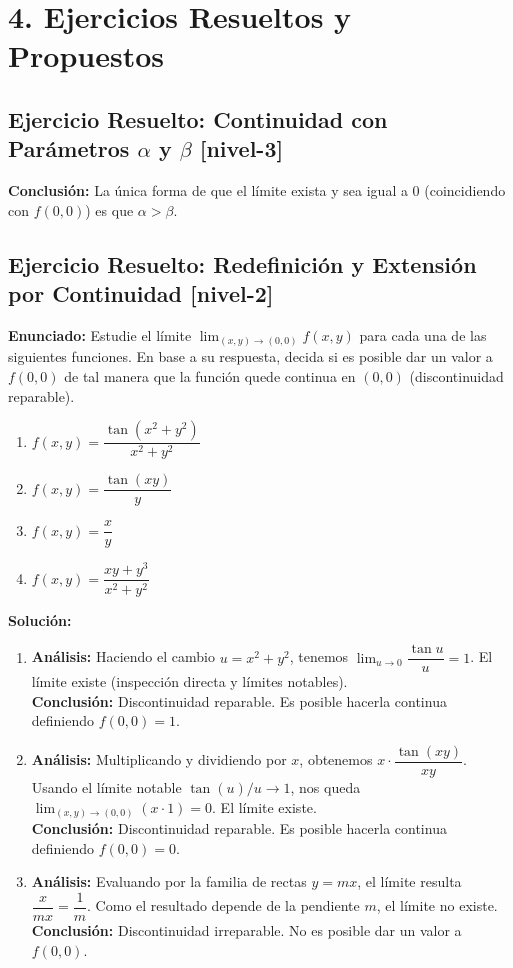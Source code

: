 \documentclass[11pt]{article}
\newenvironment{ejercicios}{%
  \section*{4. Ejercicios Resueltos y Propuestos}%
}{}
\newenvironment{ejercicioresuelto}[2]{\subsection*{Ejercicio Resuelto: #1 \small{[#2]}}}{}
\newcommand{\enunciado}[1]{\textbf{Enunciado:} #1\par\vspace{0.2cm}}
\newcommand{\solucion}[1]{\textbf{Solución:} #1\par\vspace{0.4cm}}
\begin{document}
\begin{ejercicios}
\begin{ejercicioresuelto}{Continuidad con Parámetros $\alpha$ y $\beta$}{nivel-3}
{      \textbf{Conclusión:} La única forma de que el límite exista y sea igual a $0$ (coincidiendo con $f(0,0)$) es que $\alpha > \beta$.
    }
  \end{ejercicioresuelto}

  \begin{ejercicioresuelto}{Redefinición y Extensión por Continuidad}{nivel-2}
    \enunciado{
      Estudie el límite $\displaystyle \lim_{(x,y)\to(0,0)} f(x,y)$ para cada una de las siguientes funciones. En base a su respuesta, decida si es posible dar un valor a $f(0,0)$ de tal manera que la función quede continua en $(0,0)$ (discontinuidad reparable).
      
      \begin{enumerate}
        \item $\displaystyle f(x,y) = \dfrac{\tan(x^2+y^2)}{x^2+y^2}$
        \item $\displaystyle f(x,y) = \dfrac{\tan(xy)}{y}$
        \item $\displaystyle f(x,y) = \dfrac{x}{y}$
        \item $\displaystyle f(x,y) = \dfrac{xy+y^3}{x^2+y^2}$
      \end{enumerate}
    }
    \solucion{
      \begin{enumerate}
        \item \textbf{Análisis:} Haciendo el cambio $u = x^2+y^2$, tenemos $\displaystyle \lim_{u\to 0}\dfrac{\tan u}{u} = 1$. El límite existe (inspección directa y límites notables).\\
        \textbf{Conclusión:} Discontinuidad reparable. Es posible hacerla continua definiendo $f(0,0) = 1$.
        
        \item \textbf{Análisis:} Multiplicando y dividiendo por $x$, obtenemos $x \cdot \dfrac{\tan(xy)}{xy}$. Usando el límite notable $\tan(u)/u \to 1$, nos queda $\displaystyle \lim_{(x,y)\to(0,0)} (x \cdot 1) = 0$. El límite existe.\\
        \textbf{Conclusión:} Discontinuidad reparable. Es posible hacerla continua definiendo $f(0,0) = 0$.
        
        \item \textbf{Análisis:} Evaluando por la familia de rectas $y = mx$, el límite resulta $\dfrac{x}{mx} = \dfrac{1}{m}$. Como el resultado depende de la pendiente $m$, el límite no existe.\\
        \textbf{Conclusión:} Discontinuidad irreparable. No es posible dar un valor a $f(0,0)$.
        

\end{enumerate}}
\end{ejercicioresuelto}
\end{ejercicios}
\end{document}
